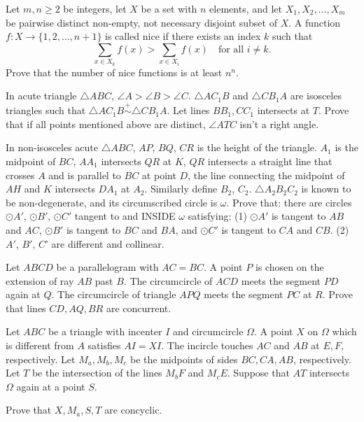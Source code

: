 \documentclass[11pt]{scrartcl}
\begin{document}
\begin{problem}[967014444176640]
Let $m,n \geqslant 2$ be integers, let $X$ be a set with $n$ elements, and let $X_1,X_2,\ldots,X_m$ be pairwise distinct non-empty, not necessary disjoint subset of $X$. A function $f \colon X \to \{1,2,\ldots,n+1\}$ is called nice if there exists an index $k$ such that\[\sum_{x \in X_k} f(x)>\sum_{x \in X_i} f(x) \quad \text{for all } i \ne k.\]Prove that the number of nice functions is at least $n^n$.
\end{problem}
\begin{problem}[8534263250311217423]
	In acute triangle $\triangle {ABC}$, $\angle 
A > \angle B > \angle C$. $\triangle {AC_1B}$ and $\triangle {CB_1A}$ are isosceles triangles such that $\triangle {AC_1B} \stackrel{+}{\sim}  \triangle {CB_1A}$. Let lines $BB_1, CC_1$ intersects at ${T}$. Prove that if all points mentioned above are distinct, $\angle ATC$ isn't a right angle.
\end{problem}
\begin{problem}[1293772592063302344]
In non-isosceles acute ${}{\triangle ABC}$, $AP$, $BQ$, $CR$ is the height of the triangle. $A_1$ is the midpoint of $BC$, $AA_1$ intersects $QR$ at $K$, $QR$ intersects a straight line that crosses ${A}$ and is parallel to $BC$ at point ${D}$, the line connecting the midpoint of $AH$ and ${K}$ intersects $DA_1$ at $A_2$. Similarly define $B_2$, $C_2$. ${}\triangle A_2B_2C_2$ is known to be non-degenerate, and its circumscribed circle is $\omega$. Prove that: there are circles $\odot A'$, $\odot B'$, $\odot C'$ tangent to and INSIDE $\omega$ satisfying:
(1) $\odot A'$ is tangent to $AB$ and $AC$, $\odot B'$ is tangent to $BC$ and $BA$, and $\odot C'$ is tangent to $CA$ and $CB$.
(2) $A'$, $B'$, $C$' are different and collinear.
\end{problem}
\begin{problem}[682786464566571]
Let $ABCD$ be a parallelogram with $AC=BC.$ A point $P$ is chosen on the extension of ray $AB$ past $B.$ The circumcircle of $ACD$ meets the segment $PD$ again at $Q.$ The circumcircle of triangle $APQ$ meets the segment $PC$ at $R.$ Prove that lines $CD,AQ,BR$ are concurrent.
\end{problem}
\begin{problem}[727078403801409]
Let $ABC$ be a triangle with incenter $I$ and circumcircle $\Omega$. A point $X$ on $\Omega$ which is different from $A$ satisfies $AI=XI$. The incircle touches $AC$ and $AB$ at $E, F$, respectively. Let $M_a, M_b, M_c$ be the midpoints of sides $BC, CA, AB$, respectively. Let $T$ be the intersection of the lines $M_bF$ and $M_cE$. Suppose that $AT$ intersects $\Omega$ again at a point $S$.

Prove that $X, M_a, S, T$ are concyclic.
\end{problem}
\end{document}
